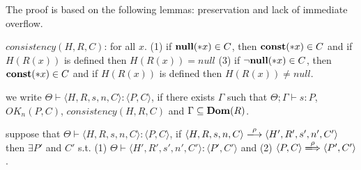 The proof is based on the following lemmas: preservation and lack of
immediate overflow.

\begin{myDef}
\label{df:Rdu}
\(consistency(H, R, C)\): for all \(x\). (1) if \({\bf null}(*x) \in C\), then \(\mathbf{const}(*x) \in C \) and if \(H(R(x))\) is defined then \(H(R(x)) = null\) (3) if \(\neg{\bf null}(*x) \in C\), then \(\mathbf{const}(*x) \in C\) and if \(H(R(x))\) is defined then \(H(R(x)) \neq null\).
\end{myDef}

\begin{myDef}
  \label{df:Rdu}
  we write \( \Theta \vdash \langle H, R, s, n, C \rangle : \langle P,
  C \rangle\), if there exists \(\Gamma\) such that \(\Theta; \Gamma \vdash s : P\), \(OK_n(P, C)\), \(consistency(H, R, C)\) and \(\Gamma \subseteq \mathbf{Dom}(R)\).
\end{myDef}

 
\begin{lemma}[Preservation]
\label{lem:preservation}
suppose that \( \Theta \vdash \langle H, R, s, n, C \rangle : \langle
P, C \rangle\), if \( \langle H, R, s, n, C \rangle
\xlongrightarrow{\rho} \langle H', R', s', n', C' \rangle\) then
\(\exists P'\) and \(C'\) s.t. (1) \( \Theta \vdash
\langle H', R', s', n', C' \rangle : \langle P', C' \rangle\) and (2)
\(\langle P, C \rangle \xLongrightarrow{\rho} \langle P', C'\rangle
\).
\end{lemma}


